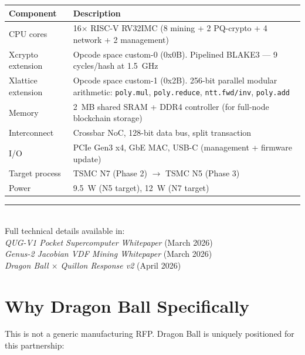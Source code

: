 \documentclass[11pt,a4paper]{article}
\begin{document}
\begin{center}
\begin{tabular}{@{}lp{10cm}@{}}
\toprule
\textbf{Component} & \textbf{Description} \\
\midrule
CPU cores & 16$\times$ RISC-V RV32IMC (8 mining + 2 PQ-crypto + 4 network + 2 management) \\
Xcrypto extension & Opcode space custom-0 (0x0B). Pipelined BLAKE3 --- 9 cycles/hash at 1.5~GHz \\
Xlattice extension & Opcode space custom-1 (0x2B). 256-bit parallel modular arithmetic: \texttt{poly.mul}, \texttt{poly.reduce}, \texttt{ntt.fwd/inv}, \texttt{poly.add} \\
Memory & 2~MB shared SRAM + DDR4 controller (for full-node blockchain storage) \\
Interconnect & Crossbar NoC, 128-bit data bus, split transaction \\
I/O & PCIe Gen3 x4, GbE MAC, USB-C (management + firmware update) \\
Target process & TSMC N7 (Phase 2) $\to$ TSMC N5 (Phase 3) \\
Power & 9.5~W (N5 target), 12~W (N7 target) \\
\bottomrule
\end{tabular}
\end{center}

\vspace{1em}

\begin{center}
\textcolor{qnkslate}{\rule{0.4\textwidth}{0.5pt}}\\[6pt]
{\small\color{qnkslate} Full technical details available in:}\\[4pt]
{\small\color{qnkblue} \textit{QUG-V1 Pocket Supercomputer Whitepaper} (March 2026)}\\
{\small\color{qnkblue} \textit{Genus-2 Jacobian VDF Mining Whitepaper} (March 2026)}\\
{\small\color{qnkblue} \textit{Dragon Ball $\times$ Quillon Response v2} (April 2026)}
\end{center}

\section{Why Dragon Ball Specifically}

This is not a generic manufacturing RFP. Dragon Ball is uniquely positioned for this partnership:
\end{document}
